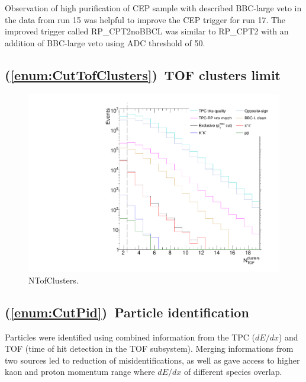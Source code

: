 Observation of high purification of CEP sample with described BBC-large veto in the data from run 15 was helpful to improve the CEP trigger for run 17. The improved trigger called RP\_CPT2noBBCL was similar to RP\_CPT2 with an addition of BBC-large veto using ADC threshold of 50.




\subsection{(\ref{enum:CutTofClusters})~TOF clusters limit}

\begin{figure}[ht!]
\centering%
\includegraphics[width=0.475\linewidth,page=1]{graphics/eventSelection/NTofClusters.pdf}%
\caption{NTofClusters.}\label{fig:NTofClusters}%
\end{figure}

\subsection{(\ref{enum:CutPid})~Particle identification}\label{subsec:pidCuts}

Particles were identified using combined information from the TPC ($dE/dx$) and TOF (time of hit detection in the TOF subsystem). Merging informations from two sources led to reduction of misidentifications, as well as gave access to higher kaon and proton momentum range where $dE/dx$ of different species overlap.

